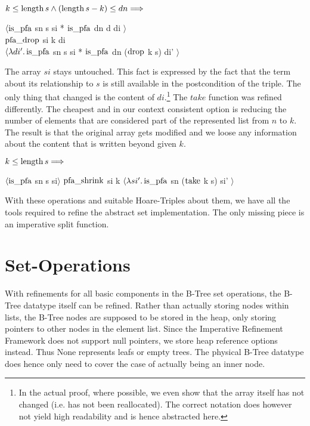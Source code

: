 \begin{lemma}
    $k \le \operatorname{length} s \wedge (\operatorname{length} s - k) \le dn \Longrightarrow$ \\
    \begin{center}
    $\langle \operatorname{is\_pfa}$ sn s si * $\operatorname{is\_pfa}$ dn d di $\rangle$ \\
    $\operatorname{pfa\_drop}$ si k di \\
    $\langle\lambda di'. \operatorname{is\_pfa}$ sn s si * $\operatorname{is\_pfa}$ dn ($\operatorname{drop}$ k s) di' $\rangle$
    \end{center}
\end{lemma}

The array $si$ stays untouched.
This fact is expressed by the fact that the term about its relationship to $s$
is still available in the postcondition of the triple.
The only thing that changed is the content of $di$.\footnote{
    In the actual proof, where possible, we even show that the array itself has not changed
    (i.e. has not been reallocated).
    The correct notation does however not yield high readability
    and is hence abstracted here.
}
The $take$ function was refined differently.
The cheapest and in our context consistent option is
reducing the number of elements that are considered part of the represented list
from $n$ to $k$.
The result is that the original array gets modified and we loose any information
about the content that is written beyond given $k$.

\begin{lemma}
    $k \le \operatorname{length} s\Longrightarrow$ \\
    \begin{center}
    $\langle \operatorname{is\_pfa}$ sn s si$\rangle$
    $\operatorname{pfa\_shrink}$ si k
    $\langle\lambda si'. \operatorname{is\_pfa}$ sn ($\operatorname{take}$ k s) si' $\rangle$
    \end{center}
\end{lemma}

With these operations and suitable Hoare-Triples about them,
we have all the tools required to refine the abstract set implementation.
The only missing piece is an imperative split function.

\section{Set-Operations}

With refinements for all basic components in the B-Tree set operations,
the B-Tree datatype itself can be refined.
Rather than actually storing nodes within lists,
the B-Tree nodes are supposed to be stored in the heap,
only storing pointers to other nodes in the element list.
Since the Imperative Refinement Framework does not support null pointers,
we store heap reference options instead.
Thus None represents leafs or empty trees.
The physical B-Tree datatype does hence only need to cover the case
of actually being an inner node.

